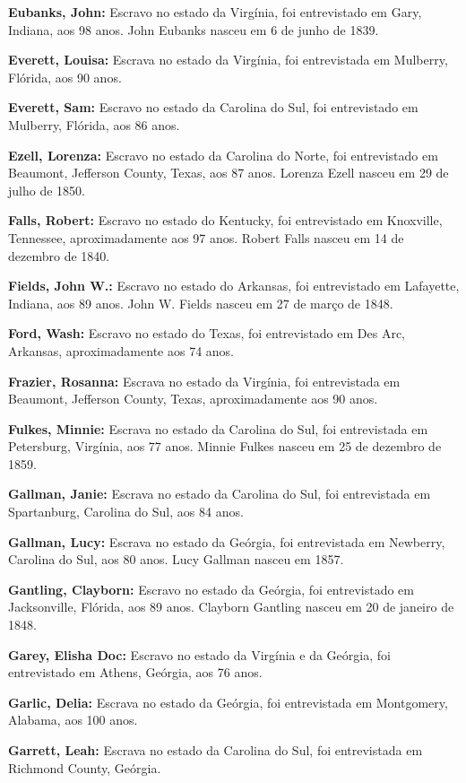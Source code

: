 \textbf{Eubanks, John:} Escravo no estado da Virgínia, foi entrevistado
em Gary, Indiana, aos 98 anos. John Eubanks nasceu em 6 de junho de
1839.

\textbf{Everett, Louisa:} Escrava no estado da Virgínia, foi
entrevistada em Mulberry, Flórida, aos 90 anos.

\textbf{Everett, Sam:} Escravo no estado da Carolina do Sul, foi
entrevistado em Mulberry, Flórida, aos 86 anos.

\textbf{Ezell, Lorenza:} Escravo no estado da Carolina do Norte, foi
entrevistado em Beaumont, Jefferson County, Texas, aos 87 anos. Lorenza
Ezell nasceu em 29 de julho de 1850.

\textbf{Falls, Robert:} Escravo no estado do Kentucky, foi entrevistado
em Knoxville, Tennessee, aproximadamente aos 97 anos. Robert Falls
nasceu em 14 de dezembro de 1840.

\textbf{Fields, John W.:} Escravo no estado do Arkansas, foi
entrevistado em Lafayette, Indiana, aos 89 anos. John W. Fields nasceu
em 27 de março de 1848.

\textbf{Ford, Wash:} Escravo no estado do Texas, foi entrevistado em Des
Arc, Arkansas, aproximadamente aos 74 anos.

\textbf{Frazier, Rosanna:} Escrava no estado da Virgínia, foi
entrevistada em Beaumont, Jefferson County, Texas, aproximadamente aos
90 anos.

\textbf{Fulkes, Minnie:} Escrava no estado da Carolina do Sul, foi
entrevistada em Petersburg, Virgínia, aos 77 anos. Minnie Fulkes nasceu
em 25 de dezembro de 1859.

\textbf{Gallman, Janie:} Escrava no estado da Carolina do Sul, foi
entrevistada em Spartanburg, Carolina do Sul, aos 84 anos.

\textbf{Gallman, Lucy:} Escrava no estado da Geórgia, foi entrevistada
em Newberry, Carolina do Sul, aos 80 anos. Lucy Gallman nasceu em 1857.

\textbf{Gantling, Clayborn:} Escravo no estado da Geórgia, foi
entrevistado em Jacksonville, Flórida, aos 89 anos. Clayborn Gantling
nasceu em 20 de janeiro de 1848.

\textbf{Garey, Elisha Doc:} Escravo no estado da Virgínia e da Geórgia,
foi entrevistado em Athens, Geórgia, aos 76 anos.

\textbf{Garlic, Delia:} Escrava no estado da Geórgia, foi entrevistada
em Montgomery, Alabama, aos 100 anos.

\textbf{Garrett, Leah:} Escrava no estado da Carolina do Sul, foi
entrevistada em Richmond County, Geórgia.

